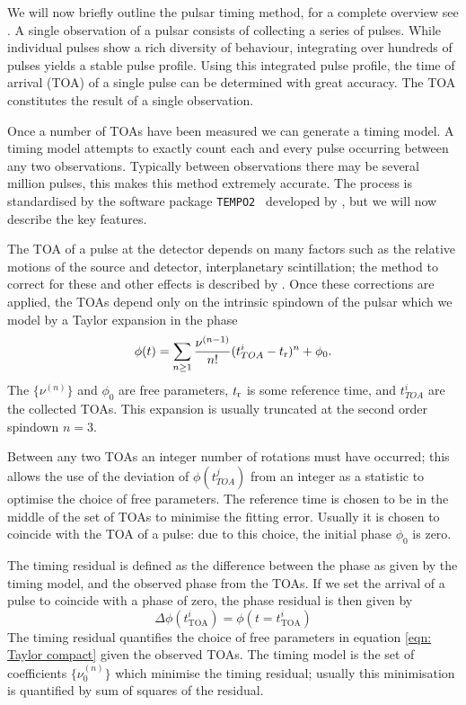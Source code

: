 We will now briefly outline the pulsar timing method, for a complete overview
see \citet{Lyne2012book}. A single observation of a pulsar consists of
collecting a series of pulses. While individual pulses show a rich diversity of
behaviour, integrating over hundreds of pulses yields a stable pulse profile.
Using this integrated pulse profile, the time of arrival (TOA) of a single pulse can be
determined with great accuracy. The TOA constitutes the result of a single
observation. 

Once a number of TOAs have been measured we can generate a timing model.  A
timing model attempts to exactly count each and every pulse occurring between
any two observations. Typically between observations there may be several
million pulses, this makes this method extremely accurate. The process is
standardised by the software package \verb+TEMPO2 + developed by
\citet{Hobbs2006}, but we will now describe the key features.

The TOA of a pulse at the detector depends on many factors such as the relative
motions of the source and detector, interplanetary scintillation; the method to
correct for these and other effects is described by \citet{Edwards2006}.  Once
these corrections are applied, the TOAs depend only on the intrinsic spindown
of the pulsar which we model by a Taylor expansion in the phase
\begin{equation}
    \phi(t) = \sum_{n\ge 1}\frac{\nu^{(n-1)}}{n!}(t_{TOA}^{i} -
    t_{\textrm{r}})^{n} + \phi_{0}.
    \label{eqn: Taylor compact}
\end{equation}
The $\{\nu^{(n)}\}$ and $\phi_{0}$ are free parameters,
$t_{\textrm{r}}$ is some reference time, and $t_{TOA}^{i}$ are the collected TOAs. This
expansion is usually truncated at the second order spindown $n=3$.

Between any two TOAs an integer number of rotations must have occurred; this
allows the use of the deviation of $\phi(t_{TOA}^{j})$ from an integer as a
statistic to optimise the choice of free parameters. The reference time is
chosen to be in the middle of the set of TOAs to minimise the fitting
error. Usually it is chosen to coincide with the TOA of a pulse: due to
this choice, the initial phase $\phi_{0}$ is zero. 

The timing residual is defined as the difference between
the phase as given by the timing model, and the observed phase from the TOAs. 
If we set the arrival of a pulse to coincide with a phase of zero, the phase
residual is then given by
\begin{equation}
    \Delta\phi \left(t^{i}_{\mathrm{TOA}}\right) = 
    \phi \left(t=t^{i}_{\mathrm{TOA}}\right)
\end{equation}
The timing residual quantifies the choice of free parameters in equation 
\eqref{eqn: Taylor compact} given the observed TOAs. 
The timing model is the set of coefficients $\{\nu_{0}^{(n)}\}$ which minimise the
timing residual; usually this minimisation is quantified by sum of squares of the
residual.

